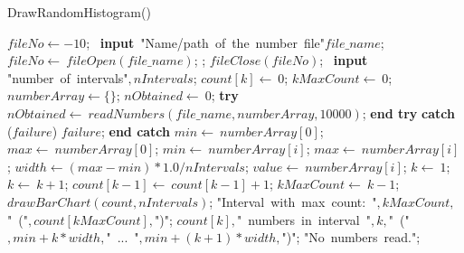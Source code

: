 \documentclass[a4paper,10pt]{article}
\begin{document}
\begin{algorithm}
\caption{DrawRandomHistogram()}
\begin{algorithmic}[5]

\STATE {}
\STATE {}
  \STATE \(fileNo\gets-10\);
  \REPEAT
    \STATE\ \textbf{input}\ \(\)"{}Name/path\ of\ the\ number\ file"{}\(file\_name\);
    \STATE \(fileNo\gets\ fileOpen(file\_name)\);
  ;
    \STATE \(fileClose(fileNo)\);
    \STATE\ \textbf{input}\ \(\)"{}number\ of\ intervals"{}\(,nIntervals\);
      \STATE \(count[k]\gets\ 0\);
    \ENDFOR
    \STATE \(kMaxCount\gets\ 0\);
    \STATE \(numberArray\gets\{\}\);
    \STATE \(nObtained\gets\ 0\);
    \STATE \textbf{try}  \BODY
      \STATE \(nObtained\gets\ readNumbers(file\_name,numberArray,10000)\);
    \ENDBODY \STATE \textbf{end try}
    \STATE \textbf{catch} (\(failure\)) \BODY
      \PRINT\(failure\);
    \ENDBODY \STATE \textbf{end catch}
      \STATE \(min\gets\ numberArray[0]\);
      \STATE \(max\gets\ numberArray[0]\);
          \STATE \(min\gets\ numberArray[i]\);
        \ELSE
            \STATE \(max\gets\ numberArray[i]\);
          \ENDIF
        \ENDIF
      \ENDFOR
      \STATE \(width\gets(max-min)*1.0/nIntervals\);
        \STATE \(value\gets\ numberArray[i]\);
        \STATE \(k\gets\ 1\);
          \STATE \(k\gets\ k+1\);
        \ENDWHILE
        \STATE \(count[k-1]\gets\ count[k-1]+1\);
          \STATE \(kMaxCount\gets\ k-1\);
        \ENDIF
      \ENDFOR
      \STATE \(drawBarChart(count,nIntervals)\);
      \PRINT\(\)"{}Interval\ with\ max\ count:\ "{}\(,kMaxCount,\)"{}\ ("{}\(,count[kMaxCount],\)"{})"{}\(\);
        \PRINT\(count[k],\)"{}\ numbers\ in\ interval\ "{}\(,k,\)"{}\ ("{}\(,min+k*width,\)"{}\ ...\ "{}\(,min+(k+1)*width,\)"{})"{}\(\);
      \ENDFOR
    \ELSE
      \PRINT\(\)"{}No\ numbers\ read."{}\(\);
    \ENDIF
  \ENDIF

\end{algorithmic}
\end{algorithm}
\end{document}
